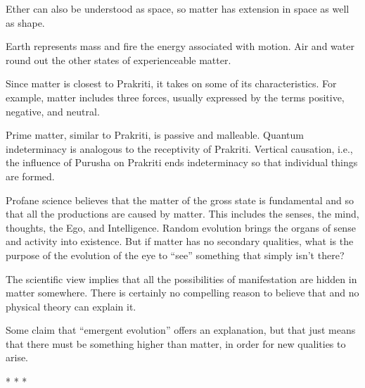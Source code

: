 Ether can also be understood as space, so matter has extension in space as well as shape.

Earth represents mass and fire the energy associated with motion. Air and water round out the other states of experienceable matter.

Since matter is closest to Prakriti, it takes on some of its characteristics. For example, matter includes three forces, usually expressed by the terms positive, negative, and neutral.

Prime matter, similar to Prakriti, is passive and malleable. Quantum indeterminacy is analogous to the receptivity of Prakriti. Vertical causation, i.e., the influence of Purusha on Prakriti ends indeterminacy so that individual things are formed.

Profane science believes that the matter of the gross state is fundamental and so that all the productions are caused by matter. This includes the senses, the mind, thoughts, the Ego, and Intelligence. Random evolution brings the organs of sense and activity into existence. But if matter has no secondary qualities, what is the purpose of the evolution of the eye to “see” something that simply isn’t there?

The scientific view implies that all the possibilities of manifestation are hidden in matter somewhere. There is certainly no compelling reason to believe that and no physical theory can explain it.

Some claim that “emergent evolution” offers an explanation, but that just means that there must be something higher than matter, in order for new qualities to arise.


\begin{center}* * *\end{center}

